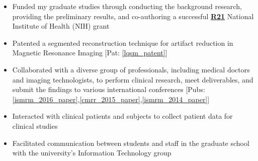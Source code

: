 \begin{minipage}{\textwidth}
	\begin{itemize}
	\item Funded my graduate studies through conducting the background research, providing the preliminary results, and co-authoring a successful \href{https://grants.nih.gov/grants/funding/r21.htm}{\textbf{R21}} National Institute of Health (NIH) grant\none
   	\item Patented a segmented reconstruction technique for artifact reduction in Magnetic Resonance Imaging [Pat: \ref{lqsm_patent}]\none
	\item Collaborated with a diverse group of professionals, including medical doctors and imaging technologists, to perform clinical research, meet deliverables, and submit the findings to various international conferences [Pubs: \ref{ismrm_2016_paper},\ref{cmrr_2015_paper},\ref{ismrm_2014_paper}]\none
	\item Interacted with clinical patients and subjects to collect patient data for clinical studies
	\item Facilitated communication between students and staff in the graduate school with the university's Information Technology group\ntwo
	\end{itemize}
\end{minipage}

